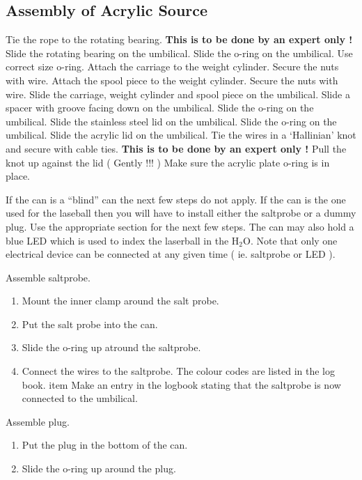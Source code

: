 \newpage

\subsection{Assembly of Acrylic Source}

\begin{enumerate}
\checkitem Tie the rope to the rotating bearing. {\bf This is to be done by an expert only !}
\checkitem Slide the rotating bearing on the umbilical.
\checkitem Slide the o-ring on the umbilical. Use correct size o-ring.
\checkitem Attach the carriage to the weight cylinder. Secure the nuts with wire.
\checkitem Attach the spool piece to the weight cylinder. Secure the nuts with wire.
\checkitem Slide the carriage, weight cylinder and spool piece  on the umbilical.
\checkitem Slide a spacer with groove facing down on the umbilical.
\checkitem Slide the o-ring on the umbilical.
\checkitem Slide the stainless steel lid on the umbilical.
\checkitem Slide the o-ring on the umbilical.
\checkitem Slide the acrylic lid on the umbilical.
\checkitem Tie the wires in a  `Hallinian' knot and secure with cable ties. {\bf This is to
be done by an expert only !}
\checkitem Pull the knot up against the lid ( Gently !!! )
\checkitem Make sure the acrylic plate o-ring is in place.

  If the can is a ``blind'' can the next few steps do not apply. If the can
is the one used for the laseball then you will have to install either the saltprobe
or a dummy plug. Use the
appropriate section for the next few steps. The can may also hold a blue LED which
is used to index the laserball in the H$_2$O. Note that only one electrical
device can be connected at any given time ( ie. saltprobe or LED ).

\checkitem Assemble saltprobe.
\begin{enumerate}

\item Mount the inner clamp around the salt probe.
\item Put the salt probe into the can.
\item Slide the o-ring up atround the saltprobe.
\item Connect the wires to the saltprobe. The colour codes are listed in the log book.
item Make an entry in the logbook stating that the saltprobe is now connected to the umbilical.
\end{enumerate}

\checkitem Assemble plug.
\begin{enumerate}
\item Put the plug in the bottom of the can.
\item Slide the o-ring up around the plug.
\end{enumerate}


\end{enumerate}
